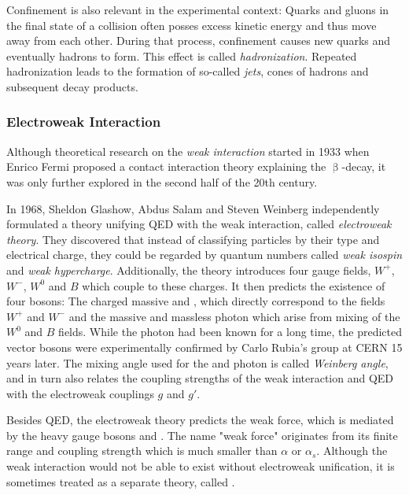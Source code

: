 Confinement is also relevant in the experimental context: Quarks and gluons in the final state of a collision often posses excess kinetic energy and thus move away from each other. During that process, confinement causes new quarks and eventually hadrons to form. This effect is called \emph{hadronization}. Repeated hadronization leads to the formation of so-called \emph{jets}, cones of hadrons and subsequent decay products.


\subsubsection{Electroweak Interaction}
Although theoretical research on the \emph{weak interaction} started in 1933 when Enrico Fermi proposed a contact interaction theory explaining the $\upbeta$-decay\cite{Fermi:Tentativodiuna}, it was only further explored in the second half of the 20th century. 

In 1968, Sheldon Glashow\cite{Glashow:PartialSymmetriesWeak}, Abdus Salam\cite{Salam:WeakElectromagneticInteractions} and Steven Weinberg\cite{Weinberg:modelleptons} independently formulated a theory unifying \ac{QED} with the weak interaction, called \emph{electroweak theory}. They discovered that instead of classifying particles by their type and electrical charge, they could be regarded by quantum numbers called \emph{weak isospin} and \emph{weak hypercharge}. Additionally, the theory introduces four gauge fields, $W^+$, $W^-$, $W^0$ and $B$ which couple to these charges. It then predicts the existence of four bosons: The charged massive \PWp and \PWm, which directly correspond to the fields $W^+$ and $W^-$ and the massive \PZ and massless photon which arise from mixing of the $W^0$ and $B$ fields. While the photon had been known for a long time, the predicted vector bosons were experimentally confirmed by Carlo Rubia's group at \acs{CERN}\cite{Arnison:ExperimentalObservationIsolated,Arnison:Experimentalobservationlepton} 15 years later.
The mixing angle used for the \PZ and photon is called \emph{Weinberg angle}, and in turn also relates the coupling strengths of the weak interaction and \ac{QED} with the electroweak couplings $g$ and $g'$\cite{Schleper:TeilchenphysikfuerFortgeschrittene}.

Besides \ac{QED}, the electroweak theory predicts the weak force, which is mediated by the heavy gauge bosons \PWpm and \PZ. The name "weak force" originates from its finite range and coupling strength which is much smaller than $\alpha$ or $\alpha_s$. Although the weak interaction would not be able to exist without electroweak unification, it is sometimes treated as a separate theory, called .


